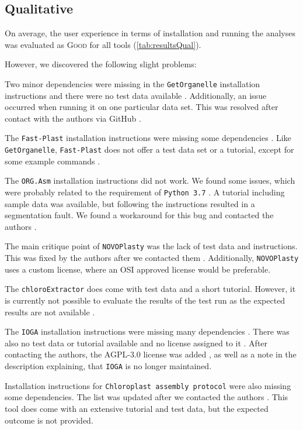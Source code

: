 \documentclass{bmcart}
\newcommand{\formatprogramnames}[1]{\texttt{#1}}
\newcommand{\ce}{\formatprogramnames{chloroExtractor}}
\newcommand{\oa}{\formatprogramnames{ORG.Asm}}
\newcommand{\fp}{\formatprogramnames{Fast-Plast}}
\newcommand{\ioga}{\formatprogramnames{IOGA}}
\newcommand{\np}{\formatprogramnames{NOVOPlasty}}
\newcommand{\go}{\formatprogramnames{GetOrganelle}}
\newcommand{\cassp}{\formatprogramnames{Chloroplast assembly protocol}}
\newcommand{\good}{\textsc{Good}}
\begin{document}
\subsection*{Qualitative}

On average, the user experience in terms of installation and running the analyses was evaluated as \good{} for all tools (\cref{tab:resultsQual}).

However, we discovered the following slight problems: 

Two minor dependencies were missing in the \go{} installation instructions and there were no test data available \cite{go_issue_10}.
Additionally, an issue occurred when running it on one particular  data set.
This was resolved after contact with the authors via GitHub \cite{go_issue_11}.
%

The \fp{} installation instructions were missing some dependencies \cite{fp_issue_33}. 
Like \go{}, \fp{} does not offer a test data set or a tutorial, except for some example commands \cite{go_issue_10}. 
%

The \oa{} installation instructions did not work.
We found some issues, which were probably related to the requirement of \texttt{Python~3.7}
\cite{oa_issue_59}.
A tutorial including sample data was available, but following the instructions resulted in a segmentation fault.
We found a workaround for this bug and contacted the authors \cite{oa_issue_57}.
%

The main critique point of \np{} was the lack of test data and instructions.
This was fixed by the authors after we contacted them \cite{np_issue_82}.
Additionally, \np{} uses a custom license, where an OSI approved license would be preferable.
%

The \ce{} does come with test data and a short tutorial.
However, it is currently not possible to evaluate the results of the test run as the expected results are not available \cite{ce_issue_139}.
%

The \ioga{} installation instructions were missing many dependencies \cite{ioga_issue_12}. There was also no test data or tutorial available and no license assigned to it \cite{ioga_issue_13}.
After contacting the authors, the AGPL-3.0 license was added \cite{ioga_issue_11}, as well as a note in the description explaining, that \ioga{} is no longer maintained. 

Installation instructions for \cassp{} were also missing some dependencies.
The list was updated after we contacted the authors \cite{cassp_issue_5}.
This tool does come with an extensive tutorial and test data, but the expected outcome is not provided.
\end{document}
